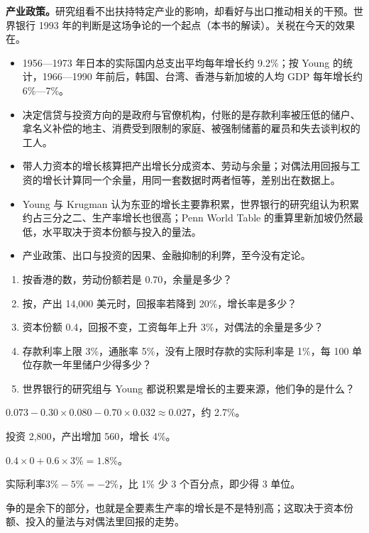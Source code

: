 \textbf{产业政策。}研究组看不出扶持特定产业的影响，却看好与出口推动相关的干预\cite{worldbank1993,worldbank1993news}。世界银行 1993 年的判断是这场争论的一个起点（本书的解读）。关税在今天的效果在。

\begin{takeaways}
\begin{itemize}
\item 1956—1973 年日本的实际国内总支出平均每年增长约 9.2\%；按 Young 的统计，1966—1990 年前后，韩国、台湾、香港与新加坡的人均 GDP 每年增长约 6\%—7\%。
\item 决定信贷与投资方向的是政府与官僚机构，付账的是存款利率被压低的储户、拿名义补偿的地主、消费受到限制的家庭、被强制储蓄的雇员和失去谈判权的工人。
\item 带人力资本的增长核算把产出增长分成资本、劳动与余量；对偶法用回报与工资的增长计算同一个余量，用同一套数据时两者恒等，差别出在数据上。
\item Young 与 Krugman 认为东亚的增长主要靠积累，世界银行的研究组认为积累约占三分之二、生产率增长也很高；Penn World Table 的重算里新加坡仍然最低，水平取决于资本份额与投入的量法。
\item 产业政策、出口与投资的因果、金融抑制的利弊，至今没有定论。
\end{itemize}
\end{takeaways}

\begin{selfcheck}
\begin{enumerate}
\item 按香港的数，劳动份额若是 0.70，余量是多少？
\item 按，产出 14,000 美元时，回报率若降到 20\%，增长率是多少？
\item 资本份额 0.4，回报不变，工资每年上升 3\%，对偶法的余量是多少？
\item 存款利率上限 3\%，通胀率 5\%，没有上限时存款的实际利率是 1\%，每 100 单位存款一年里储户少得多少？
\item 世界银行的研究组与 Young 都说积累是增长的主要来源，他们争的是什么？
\end{enumerate}
\end{selfcheck}

\begin{answers}
\item $0.073-0.30\times0.080-0.70\times0.032\approx0.027$，约 2.7\%。
\item 投资 2,800，产出增加 560，增长 4\%。
\item $0.4\times0+0.6\times3\%=1.8\%$。
\item 实际利率$3\%-5\%=-2\%$，比 1\% 少 3 个百分点，即少得 3 单位。
\item 争的是余下的部分，也就是全要素生产率的增长是不是特别高；这取决于资本份额、投入的量法与对偶法里回报的走势。
\end{answers}


